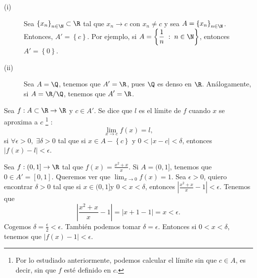 \begin{eg}
\normalfont 
\begin{description}
\item[(i)]  Sea $\displaystyle \left\{ x_{n}\right\} _{n\in\N}\subset\R $ tal que $\displaystyle x_{n} \to c $ con $\displaystyle x_{n} \neq c $ y sea $\displaystyle A = \left\{ x_{n}\right\} _{n\in\N} $. Entonces, $\displaystyle A' = \left\{ c\right\}  $. Por ejemplo, si $\displaystyle A = \left\{ \frac{1}{n} \; : \; n \in \N\right\}  $, entonces $\displaystyle A' = \left\{ 0\right\} $.
\item[(ii)] Sea $\displaystyle A = \Q $, tenemos que $\displaystyle A' = \R $, pues $\displaystyle \Q $ es denso en $\displaystyle \R $. Análogamente, si $\displaystyle A = \R/\Q $, tenemos que $\displaystyle A'=\R $.
\end{description}

\end{eg}

\begin{fdefinition}[Límite]
\normalfont Sea $\displaystyle f : A \subset \R \to \R $ y $\displaystyle c \in A' $. Se dice que $\displaystyle l $ es el límite de $\displaystyle f $ cuando $\displaystyle x $ se aproxima a $\displaystyle c $ \footnote{Por lo estudiado anteriormente, podemos calcular el límite sin que $\displaystyle c \in A $, es decir, sin que $\displaystyle f $ esté definido en $\displaystyle c $.} : 
\[\lim_{x \to c}f\left(x\right) = l ,\]
si $\displaystyle \forall \epsilon > 0, \; \exists \delta > 0 $ tal que si $\displaystyle x \in A - \left\{ c\right\}  $ y $\displaystyle 0< \left|x-c\right|<\delta $, entonces $\displaystyle \left|f\left(x\right)-l\right|<\epsilon $.
\end{fdefinition}

\begin{eg}
	\normalfont Sea $\displaystyle f: (0,1] \to \R $ tal que $\displaystyle f\left(x\right) = \frac{x^{2}+x}{x} $. Si $\displaystyle A = (0,1] $, tenemos que $\displaystyle 0 \in A' = \left[0,1\right]  $. Queremos ver que $\displaystyle \lim_{x \to 0}f\left(x\right) =1 $. Sea $\displaystyle \epsilon > 0 $, quiero encontrar $\displaystyle \delta > 0 $ tal que si $\displaystyle x \in (0,1] $y $\displaystyle 0 < x < \delta  $, entonces $\displaystyle \left|\frac{x^{2}+x }{x }-1\right| < \epsilon  $. Tenemos que 
	\[ \left|\frac{x^{2}+x }{x }-1\right| = \left|x +1 - 1\right|= x < \epsilon  .\]
Cogemos $\displaystyle \delta = \frac{\epsilon }{2} < \epsilon  $. También podemos tomar $\displaystyle \delta = \epsilon  $. Entonces si $\displaystyle 0 < x< \delta  $, tenemos que $\displaystyle \left|f\left(x\right)-1\right| < \epsilon  $.
\end{eg}

